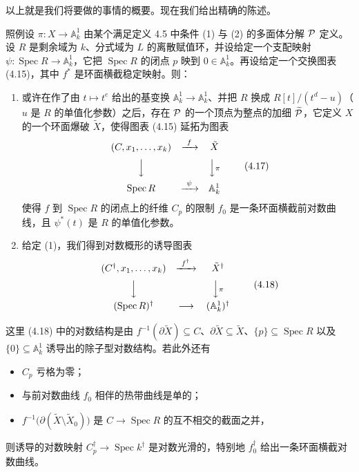 以上就是我们将要做的事情的概要。现在我们给出精确的陈述。

\begin{theorem}
照例设 $\pi:X\to\mathbb{A}^1_k$ 由某个满足定义 4.5 中条件 (1) 与 (2) 的多面体分解 $\mathcal{P}$ 定义。设 $R$ 是剩余域为 $k$、分式域为 $L$ 的离散赋值环，并设给定一个支配映射 $\psi:\operatorname{Spec} R\to\mathbb{A}^1_k$，它把 $\operatorname{Spec} R$ 的闭点 $p$ 映到 $0\in\mathbb{A}^1_k$。再设给定一个交换图表 (4.15)，其中 $f^*$ 是环面横截稳定映射。则：

\begin{enumerate}[label=(\arabic*)]
\item 或许在作了由 $t\mapsto t^e$ 给出的基变换 $\mathbb{A}^1_k\to\mathbb{A}^1_k$、并把 $R$ 换成 $R[t]/(t^d-u)$（$u$ 是 $R$ 的单值化参数）之后，存在 $\mathcal{P}$ 的一个顶点为整点的加细 $\widetilde{\mathcal{P}}$，它定义 $X$ 的一个环面爆破 $\tilde X$，使得图表 (4.15) 延拓为图表
\begin{equation}
\begin{array}{ccc}
(C,x_1,\dots,x_k) & \xrightarrow{\ f\ } & \tilde X\\[6pt]
\Big\downarrow & & \Big\downarrow{\scriptstyle\pi}\\[6pt]
\operatorname{Spec} R & \xrightarrow{\ \psi\ } & \mathbb{A}^1_k
\end{array}
\tag{4.17}
\end{equation}
使得 $f$ 到 $\operatorname{Spec} R$ 的闭点上的纤维 $C_p$ 的限制 $f_0$ 是一条环面横截前对数曲线，且 $\psi^*(t)$ 是 $R$ 的单值化参数。
\item 给定 (1)，我们得到对数概形的诱导图表
\begin{equation}
\begin{array}{ccc}
(C^\dagger,x_1,\dots,x_k) & \xrightarrow{\ f^\dagger\ } & \tilde X^\dagger\\[6pt]
\Big\downarrow & & \Big\downarrow{\scriptstyle\pi}\\[6pt]
(\operatorname{Spec} R)^\dagger & \longrightarrow & (\mathbb{A}^1_k)^\dagger
\end{array}
\tag{4.18}
\end{equation}
\end{enumerate}

这里 (4.18) 中的对数结构是由 $f^{-1}(\partial\tilde X)\subseteq C$、$\partial\tilde X\subseteq\tilde X$、$\{p\}\subseteq\operatorname{Spec} R$ 以及 $\{0\}\subseteq\mathbb{A}^1_k$ 诱导出的除子型对数结构。若此外还有
\begin{itemize}[leftmargin=2em]
\item $C_p$ 亏格为零；
\item 与前对数曲线 $f_0$ 相伴的热带曲线是单的；
\item $f^{-1}\big(\partial(\tilde X\setminus\tilde X_0)\big)$ 是 $C\to\operatorname{Spec} R$ 的互不相交的截面之并，
\end{itemize}
则诱导的对数映射 $C_p^\dagger\to\operatorname{Spec}k^\dagger$ 是对数光滑的，特别地 $f_0^\dagger$ 给出一条环面横截对数曲线。
\end{theorem}

